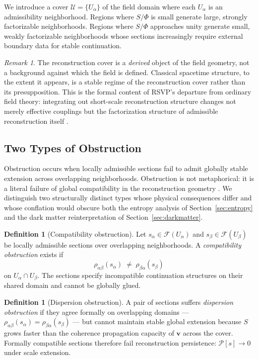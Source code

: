 \documentclass[11pt, a4paper]{article}
\theoremstyle{plain}
\theoremstyle{definition}
\newtheorem{definition}[theorem]{Definition}
\theoremstyle{remark}
\newtheorem{remark}[theorem]{Remark}
\newcommand{\sheaf}{\mathcal{F}}
\newcommand{\cover}{\{U_\alpha\}}
\newcommand{\Ucover}{\mathcal{U}}
\begin{document}
We introduce a cover $\Ucover = \cover$ of the field domain where each $U_\alpha$
is an admissibility neighborhood. Regions where $S/\Phi$ is small generate large,
strongly factorizable neighborhoods. Regions where $S/\Phi$ approaches unity
generate small, weakly factorizable neighborhoods whose sections increasingly require
external boundary data for stable continuation.

\begin{remark}
\label{rem:cover-derived}
The reconstruction cover is a \emph{derived} object of the field geometry, not a
background against which the field is defined. Classical spacetime structure, to the
extent it appears, is a stable regime of the reconstruction cover rather than its
presupposition. This is the formal content of RSVP's departure from ordinary field
theory: integrating out short-scale reconstruction structure changes not merely
effective couplings but the factorization structure of admissible reconstruction
itself \cite{wilson1974,goldenfeld1992}.
\end{remark}

\subsection{Two Types of Obstruction}

Obstruction occurs when locally admissible sections fail to admit globally stable
extension across overlapping neighborhoods. Obstruction is not metaphorical: it is a
literal failure of global compatibility in the reconstruction geometry
\cite{bott1982,hatcher2002}. We distinguish two structurally distinct types whose
physical consequences differ and whose conflation would obscure both the entropy
analysis of Section~\ref{sec:entropy} and the dark matter reinterpretation of
Section~\ref{sec:darkmatter}.

\begin{definition}[Compatibility obstruction]
\label{def:compat-obs}
Let $s_\alpha \in \sheaf(U_\alpha)$ and $s_\beta \in \sheaf(U_\beta)$ be locally
admissible sections over overlapping neighborhoods. A \emph{compatibility
obstruction} exists if
\[
  \rho_{\alpha\beta}(s_\alpha) \;\neq\; \rho_{\beta\alpha}(s_\beta)
\]
on $U_\alpha \cap U_\beta$. The sections specify incompatible continuation structures
on their shared domain and cannot be globally glued.
\end{definition}

\begin{definition}[Dispersion obstruction]
\label{def:disp-obs}
A pair of sections suffers \emph{dispersion obstruction} if they agree formally on
overlapping domains --- $\rho_{\alpha\beta}(s_\alpha) = \rho_{\beta\alpha}(s_\beta)$
--- but cannot maintain stable global extension because $S$ grows faster than the
coherence propagation capacity of $\mathbf{v}$ across the cover. Formally compatible
sections therefore fail reconstruction persistence: $\mathcal{P}[s] \to 0$ under
scale extension.
\end{definition}
\end{document}
